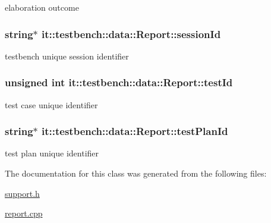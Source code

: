 elaboration outcome \hypertarget{classit_1_1testbench_1_1data_1_1Report_add363a3f8077b011675f79a2d39f58de}{
\subsubsection[{session\-Id}]{\setlength{\rightskip}{0pt plus 5cm}string$\ast$ it\-::testbench\-::data\-::\-Report\-::session\-Id\hspace{0.3cm}{\ttfamily [private]}}}\label{d5/de8/classit_1_1testbench_1_1data_1_1Report_add363a3f8077b011675f79a2d39f58de}
testbench unique session identifier \hypertarget{classit_1_1testbench_1_1data_1_1Report_af8e8837646af6eeb142e49d33440dc07}{
\subsubsection[{test\-Id}]{\setlength{\rightskip}{0pt plus 5cm}unsigned int it\-::testbench\-::data\-::\-Report\-::test\-Id\hspace{0.3cm}{\ttfamily [private]}}}\label{d5/de8/classit_1_1testbench_1_1data_1_1Report_af8e8837646af6eeb142e49d33440dc07}
test case unique identifier \hypertarget{classit_1_1testbench_1_1data_1_1Report_ae2746165d3df8a1dcd390547b95e9516}{
\subsubsection[{test\-Plan\-Id}]{\setlength{\rightskip}{0pt plus 5cm}string$\ast$ it\-::testbench\-::data\-::\-Report\-::test\-Plan\-Id\hspace{0.3cm}{\ttfamily [private]}}}\label{d5/de8/classit_1_1testbench_1_1data_1_1Report_ae2746165d3df8a1dcd390547b95e9516}
test plan unique identifier 

The documentation for this class was generated from the following files\-:\begin{DoxyCompactItemize}
\item 
\hyperlink{support_8h}{support.\-h}\item 
\hyperlink{report_8cpp}{report.\-cpp}\end{DoxyCompactItemize}
